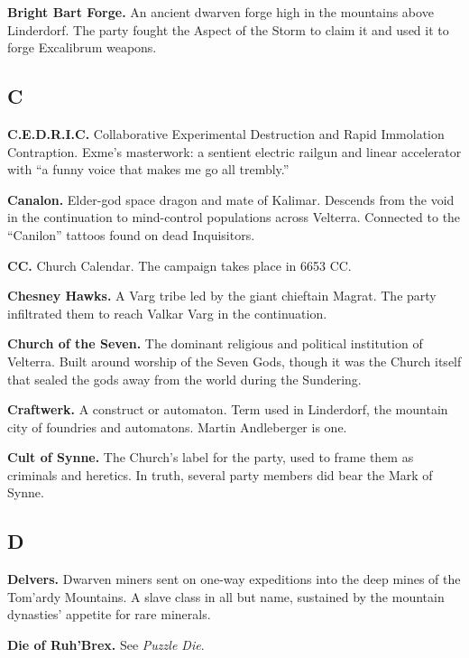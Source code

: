 \smallskip \noindent
\textbf{Bright Bart Forge.} An ancient dwarven forge high in the mountains above Linderdorf. The party fought the Aspect of the Storm to claim it and used it to forge Excalibrum weapons.

\subsection*{C}

\noindent
\textbf{C.E.D.R.I.C.} Collaborative Experimental Destruction and Rapid Immolation Contraption. Exme's masterwork: a sentient electric railgun and linear accelerator with ``a funny voice that makes me go all trembly.''

\smallskip \noindent
\textbf{Canalon.} Elder-god space dragon and mate of Kalimar. Descends from the void in the continuation to mind-control populations across Velterra. Connected to the ``Canilon'' tattoos found on dead Inquisitors.

\smallskip \noindent
\textbf{CC.} Church Calendar. The campaign takes place in 6653 CC.

\smallskip \noindent
\textbf{Chesney Hawks.} A Varg tribe led by the giant chieftain Magrat. The party infiltrated them to reach Valkar Varg in the continuation.

\smallskip \noindent
\textbf{Church of the Seven.} The dominant religious and political institution of Velterra. Built around worship of the Seven Gods, though it was the Church itself that sealed the gods away from the world during the Sundering.

\smallskip \noindent
\textbf{Craftwerk.} A construct or automaton. Term used in Linderdorf, the mountain city of foundries and automatons. Martin Andleberger is one.

\smallskip \noindent
\textbf{Cult of Synne.} The Church's label for the party, used to frame them as criminals and heretics. In truth, several party members did bear the Mark of Synne.

\subsection*{D}

\noindent
\textbf{Delvers.} Dwarven miners sent on one-way expeditions into the deep mines of the Tom'ardy Mountains. A slave class in all but name, sustained by the mountain dynasties' appetite for rare minerals.

\smallskip \noindent
\textbf{Die of Ruh'Brex.} See \textit{Puzzle Die}.


